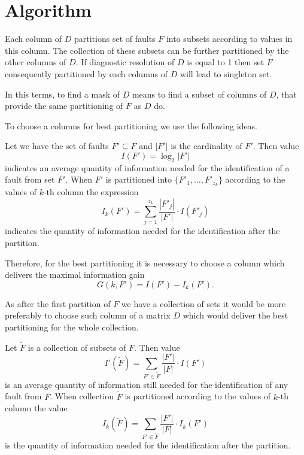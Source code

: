 \documentclass{article}
\begin{document}


\section{Algorithm}
Each column of $D$ partitions set of faults $F$ into subsets
according to values in this column. The collection of these
subsets can be further partitioned by the other columns of $D$. If
diagnostic resolution of $D$ is equal to 1 then set $F$
consequently partitioned by each columns of $D$ will lead to
singleton set.

In this terms, to find a mask of $D$ means to find a subset of
columns of $D$, that provide the same partitioning of $F$ as $D$
do.

To choose a columns for best partitioning we use the following
ideas.

Let we have the set of faults $F'\subseteq F$ and $|F'|$ is the
cardinality of $F'$. Then value
\begin{equation}\label{eq:01}
    I(F')=\log_2|F'|
\end{equation}
indicates an average quantity of information needed for the
identification of a fault from set $F'$. When $F'$ is partitioned
into $\{F'_1, \ldots, F'_{z_k}\}$ according to the values of
$k$-th column the expression
\begin{equation}\label{eq:02}
    I_k(F')=\sum\limits_{j=1}^{z_k}\frac {|F'_j|}{|F'|}\cdot I(F'_j)
\end{equation}
indicates the quantity of information needed for the
identification after the partition.

Therefore,  for the best partitioning it is necessary to choose a
column which delivers the maximal information gain
\begin{equation}\label{eq:03}
    G(k,F')=I(F')-I_k(F').
\end{equation}

As after the first partition of $F$ we have a collection of sets
it would be more preferably to choose such column of a matrix $D$
which would deliver the best partitioning for the whole
collection.

Let $\widetilde F$ is a collection of subsets of $F$. Then value
\begin{equation}\label{eq:04}
    I'(\widetilde F)=\sum\limits_{F'\in \widetilde F}\frac
    {|F'|}{|F|}\cdot I(F')
\end{equation}
is an average quantity of information still needed for the
identification of any fault from $F$. When collection $\widetilde
F$ is partitioned according to the values of $k$-th column the
value
\begin{equation}\label{eq:05}
    I_k(\widetilde F)=\sum\limits_{F'\in \widetilde F}\frac
    {|F'|}{|F|}\cdot I_k(F')
\end{equation}
is the quantity of information needed for the identification after
the partition.
\end{document}

